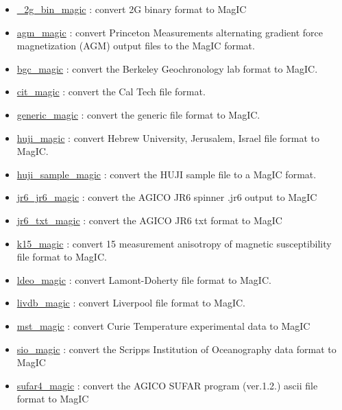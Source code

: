 \documentclass[11pt]{book}
\begin{document}
{{\begin{itemize}
\begin{itemize}
\item \href{http://pmagpy.github.io/PmagPy.html#_2g_bin_magic}{\_2g\_bin\_magic} : convert 2G binary format to MagIC
\item \href{http://pmagpy.github.io/PmagPy.html#agm_magic}{agm\_magic} : convert Princeton Measurements alternating gradient force magnetization (AGM) output files to the MagIC format.
\item \href{http://pmagpy.github.io/PmagPy.html#bgc_magic}{bgc\_magic} : convert the Berkeley Geochronology lab format to MagIC.
\item \href{http://pmagpy.github.io/PmagPy.html#cit_magic}{cit\_magic} : convert the Cal Tech file format.
\item \href{http://pmagpy.github.io/PmagPy.html#generic_magic}{generic\_magic} : convert the generic file format to MagIC.
\item \href{http://pmagpy.github.io/PmagPy.html#huji_magic}{huji\_magic} : convert Hebrew University, Jerusalem, Israel file format to MagIC.
\item \href{http://pmagpy.github.io/PmagPy.html#huji_sample_magic}{huji\_sample\_magic} : convert the HUJI sample file to a MagIC format.
\item \href{http://pmagpy.github.io/PmagPy.html#jr6_jr6}{jr6\_jr6\_magic} : convert the AGICO JR6 spinner .jr6 output to MagIC
\item \href{http://pmagpy.github.io/PmagPy.html#jr6_txt_magic}{jr6\_txt\_magic} : convert the AGICO JR6 txt format to MagIC
\item \href{http://pmagpy.github.io/PmagPy.html#k15_magic}{k15\_magic} : convert  15 measurement anisotropy of magnetic susceptibility file format to MagIC.
\item \href{http://pmagpy.github.io/PmagPy.html#ldeo_magic}{ldeo\_magic} : convert Lamont-Doherty file format to MagIC.
\item \href{http://pmagpy.github.io/PmagPy.html#livdb_magic}{livdb\_magic} : convert Liverpool file format to MagIC.
\item \href{http://pmagpy.github.io/PmagPy.html#mst_magic}{mst\_magic} : convert Curie Temperature experimental data to MagIC
\item \href{http://pmagpy.github.io/PmagPy.html#sio_magic}{sio\_magic} : convert the Scripps Institution of Oceanography data format to MagIC
\item \href{http://pmagpy.github.io/PmagPy.html#sufar4_magic}{sufar4\_magic} : convert the AGICO SUFAR program (ver.1.2.) ascii file format to MagIC

\end{itemize}
\end{itemize}}}
\end{document}
